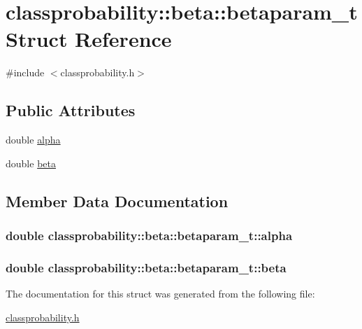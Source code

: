 \hypertarget{structclassprobability_1_1beta_1_1betaparam__t}{}\section{classprobability\+:\+:beta\+:\+:betaparam\+\_\+t Struct Reference}
\label{structclassprobability_1_1beta_1_1betaparam__t}


{\ttfamily \#include $<$classprobability.\+h$>$}

\subsection*{Public Attributes}
\begin{DoxyCompactItemize}
\item 
double \hyperlink{structclassprobability_1_1beta_1_1betaparam__t_a0ca206d21ac7436dc59dfbcc2232f52f}{alpha}
\item 
double \hyperlink{structclassprobability_1_1beta_1_1betaparam__t_aa14fbea4af8ba841aece6ba1c392b243}{beta}
\end{DoxyCompactItemize}


\subsection{Member Data Documentation}
\subsubsection[{\texorpdfstring{alpha}{alpha}}]{\setlength{\rightskip}{0pt plus 5cm}double classprobability\+::beta\+::betaparam\+\_\+t\+::alpha}\hypertarget{structclassprobability_1_1beta_1_1betaparam__t_a0ca206d21ac7436dc59dfbcc2232f52f}{}\label{structclassprobability_1_1beta_1_1betaparam__t_a0ca206d21ac7436dc59dfbcc2232f52f}
\subsubsection[{\texorpdfstring{beta}{beta}}]{\setlength{\rightskip}{0pt plus 5cm}double classprobability\+::beta\+::betaparam\+\_\+t\+::beta}\hypertarget{structclassprobability_1_1beta_1_1betaparam__t_aa14fbea4af8ba841aece6ba1c392b243}{}\label{structclassprobability_1_1beta_1_1betaparam__t_aa14fbea4af8ba841aece6ba1c392b243}


The documentation for this struct was generated from the following file\+:\begin{DoxyCompactItemize}
\item 
\hyperlink{classprobability_8h}{classprobability.\+h}\end{DoxyCompactItemize}

